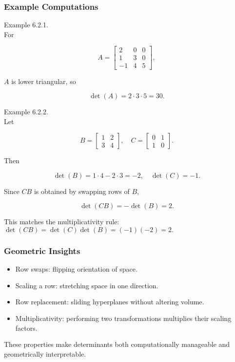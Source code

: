 \documentclass[
  12pt,
  a4paper,
]{article}
\begin{document}
\subsubsection{Example Computations}\label{example-computations}

Example 6.2.1.\\
For

\[A = \begin{bmatrix}
2 & 0 & 0 \\
1 & 3 & 0 \\
-1 & 4 & 5
\end{bmatrix},\]

\(A\) is lower triangular, so

\[\det(A) = 2 \cdot 3 \cdot 5 = 30.\]

Example 6.2.2.\\
Let

\[B = \begin{bmatrix} 1 & 2 \\ 3 & 4 \end{bmatrix}, \quad
C = \begin{bmatrix} 0 & 1 \\ 1 & 0 \end{bmatrix}.\]

Then

\[\det(B) = 1\cdot 4 - 2\cdot 3 = -2, \quad \det(C) = -1.\]

Since \(CB\) is obtained by swapping rows of \(B\),

\[\det(CB) = -\det(B) = 2.\]

This matches the multiplicativity rule:
\(\det(CB) = \det(C)\det(B) = (-1)(-2) = 2.\)

\subsubsection{Geometric Insights}\label{geometric-insights}

\begin{itemize}
\item
  Row swaps: flipping orientation of space.
\item
  Scaling a row: stretching space in one direction.
\item
  Row replacement: sliding hyperplanes without altering volume.
\item
  Multiplicativity: performing two transformations multiplies their
  scaling factors.
\end{itemize}

These properties make determinants both computationally manageable and
geometrically interpretable.
\end{document}
